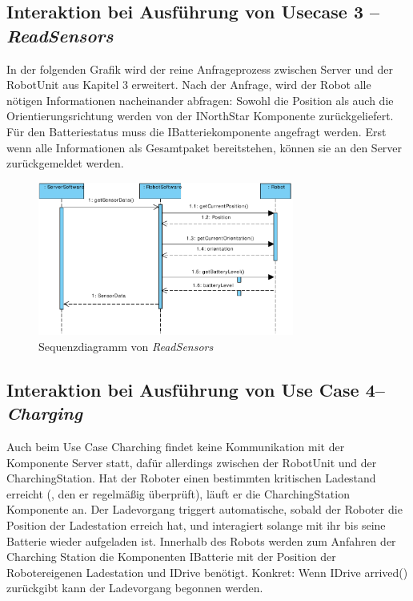 	\subsection*{Interaktion bei Ausführung von Usecase 3 – \emph{ReadSensors}}
In der folgenden Grafik wird der reine Anfrageprozess zwischen Server und der RobotUnit aus Kapitel 3 erweitert. Nach der Anfrage, wird der Robot alle nötigen Informationen nacheinander abfragen: Sowohl die Position als auch die Orientierungsrichtung werden von der INorthStar Komponente zurückgeliefert. Für den Batteriestatus muss die IBatteriekomponente angefragt werden. Erst wenn alle Informationen als Gesamtpaket bereitstehen, können sie an den Server zurückgemeldet werden.
\\
	\begin{figure}[H]
		\centering
		\includegraphics[width=0.75\textwidth]{img/0-Entwurf-8-ReadSens}
		\caption{Sequenzdiagramm von \emph{ReadSensors}}
		\label{ReadSensors}
	\end{figure}
	
	\subsection*{Interaktion bei Ausführung von Use Case 4– \emph{Charging}}
	Auch beim Use Case Charching findet keine Kommunikation mit der Komponente Server statt, dafür allerdings zwischen der RobotUnit und der CharchingStation. Hat der Roboter einen bestimmten kritischen Ladestand erreicht (, den er regelmäßig überprüft), läuft er die CharchingStation Komponente an. Der Ladevorgang triggert automatische, sobald der Roboter die Position der Ladestation erreich hat, und interagiert solange mit ihr bis seine Batterie wieder aufgeladen ist. Innerhalb des Robots werden zum Anfahren der Charching Station die Komponenten IBatterie mit der Position der Robotereigenen Ladestation und IDrive benötigt. Konkret: Wenn IDrive arrived() zurückgibt kann der Ladevorgang begonnen werden.

